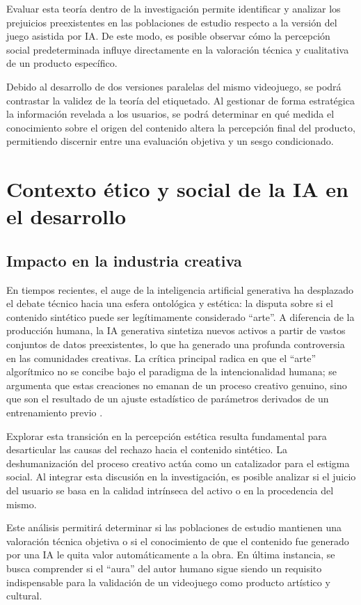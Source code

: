 Evaluar esta teoría dentro de la investigación permite identificar y analizar los prejuicios preexistentes en las poblaciones de estudio respecto a la versión del juego asistida por IA. De este modo, es posible observar cómo la percepción social predeterminada influye directamente en la valoración técnica y cualitativa de un producto específico.

Debido al desarrollo de dos versiones paralelas del mismo videojuego, se podrá contrastar la validez de la teoría del etiquetado. Al gestionar de forma estratégica la información revelada a los usuarios, se podrá determinar en qué medida el conocimiento sobre el origen del contenido altera la percepción final del producto, permitiendo discernir entre una evaluación objetiva y un sesgo condicionado.


\section{Contexto ético y social de la IA en el desarrollo}
\subsection{Impacto en la industria creativa}

En tiempos recientes, el auge de la inteligencia artificial generativa ha desplazado el debate técnico hacia una esfera ontológica y estética: la disputa sobre si el contenido sintético puede ser legítimamente considerado “arte”. A diferencia de la producción humana, la IA generativa sintetiza nuevos activos a partir de vastos conjuntos de datos preexistentes, lo que ha generado una profunda controversia en las comunidades creativas. La crítica principal radica en que el “arte” algorítmico no se concibe bajo el paradigma de la intencionalidad humana; se argumenta que estas creaciones no emanan de un proceso creativo genuino, sino que son el resultado de un ajuste estadístico de parámetros derivados de un entrenamiento previo \cite{baxter2024aiart}.

Explorar esta transición en la percepción estética resulta fundamental para desarticular las causas del rechazo hacia el contenido sintético. La deshumanización del proceso creativo actúa como un catalizador para el estigma social. Al integrar esta discusión en la investigación, es posible analizar si el juicio del usuario se basa en la calidad intrínseca del activo o en la procedencia del mismo.

Este análisis permitirá determinar si las poblaciones de estudio mantienen una valoración técnica objetiva o si el conocimiento de que el contenido fue generado por una IA le quita valor automáticamente a la obra. En última instancia, se busca comprender si el “aura” del autor humano sigue siendo un requisito indispensable para la validación de un videojuego como producto artístico y cultural. 

